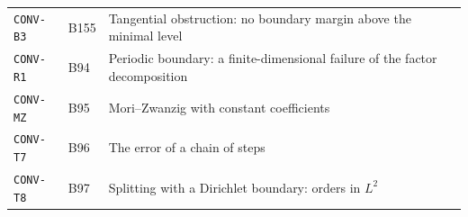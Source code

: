 \begin{center}
\begin{longtable}{@{}L{3.6cm}L{1.2cm}L{8.0cm}L{1.2cm}@{}}
\texttt{CONV-B3} & B155 & Tangential obstruction: no boundary margin above the minimal level & \pageref{dim:CONV-B3}\\
\texttt{CONV-R1} & B94 & Periodic boundary: a finite-dimensional failure of the factor decomposition & \pageref{dim:CONV-R1}\\
\texttt{CONV-MZ} & B95 & Mori--Zwanzig with constant coefficients & \pageref{dim:CONV-MZ}\\
\texttt{CONV-T7} & B96 & The error of a chain of steps & \pageref{dim:CONV-T7}\\
\texttt{CONV-T8} & B97 & Splitting with a Dirichlet boundary: orders in $L^2$ & \pageref{dim:CONV-T8}\\
\bottomrule
\end{longtable}
\end{center}

